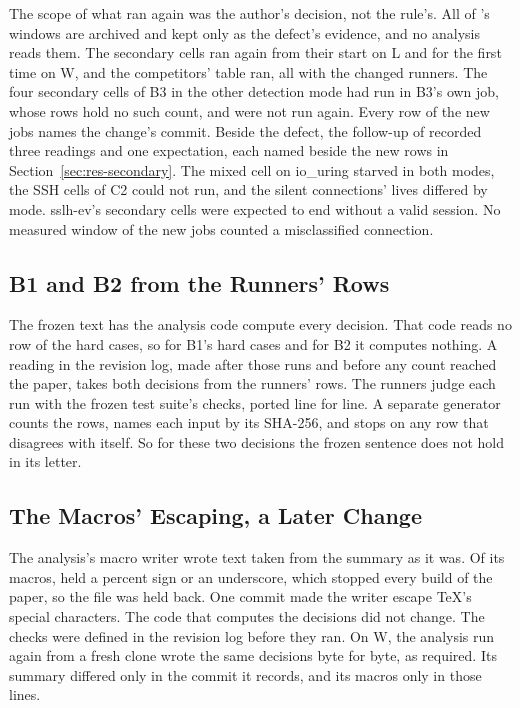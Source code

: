  The scope of what ran again was the author's decision, not the rule's.
All of \JobSlOne{}'s windows are archived and kept only as the defect's evidence, and no analysis
reads them. The secondary cells ran again from their start on L and for the first time on W, and
the competitors' table ran, all with the changed runners. The four secondary cells of B3 in the
other detection mode had run in B3's own job, whose rows hold no such count, and were not run
again. Every row of the new jobs names the change's commit. Beside the defect, the follow-up of
\JobSlOne{} recorded three readings and one expectation, each named beside the new rows in
Section~\ref{sec:res-secondary}. The mixed cell on io\_uring starved in both modes, the SSH cells
of C2 could not run, and the silent connections' lives differed by mode. sslh-ev's secondary cells
were expected to end without a valid session. No measured window of the new jobs counted a
misclassified connection.

\subsection{B1 and B2 from the Runners' Rows}\label{sec:dev-runners}

The frozen text has the analysis code compute every decision. That code reads no row of the hard
cases, so for B1's hard cases and for B2 it computes nothing. A reading in the revision log, made
after those runs and before any count reached the paper, takes both decisions from the runners'
rows. The runners judge each run with the frozen test suite's checks, ported line for line. A
separate generator counts the rows, names each input by its SHA-256, and stops on any row that
disagrees with itself. So for these two decisions the frozen sentence does not hold in its letter.

\subsection{The Macros' Escaping, a Later Change}\label{sec:dev-escaping}

The analysis's macro writer wrote text taken from the summary as it was. Of its \HeldBackMacros{}
macros, \CountEscapedLines{} held a percent sign or an underscore, which stopped every build of the
paper, so the file was held back. One commit made the writer escape TeX's special characters. The
code that computes the decisions did not change. The checks were defined in the revision log before
they ran. On W, the analysis run again from a fresh clone wrote the same decisions byte for byte, as
required. Its summary differed only in the commit it records, and its macros only in those lines.


